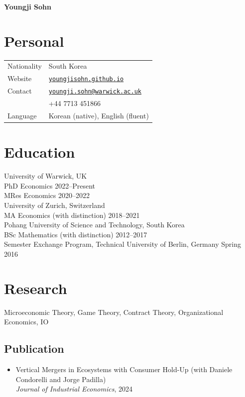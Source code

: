 \documentclass[11pt]{article}
\begin{document}
{\bfseries \large Youngji Sohn}\vspace{11pt}

\section*{Personal}
\begin{tabular}{@{}p{6.5em}l@{}}
{Nationality} 	& South Korea\\
{Website}  	&{\href{https://youngjisohn.github.io}{\texttt{youngjisohn.github.io}}}\\
{Contact}     	& \href{mailto:youngji.sohn@warwick.ac.uk}{\texttt{youngji.sohn@warwick.ac.uk}}\\
                     		& +44 7713 451866\\
{Language}    & Korean (native), English (fluent)\\
\end{tabular}
\section*{Education}
{University of Warwick}, UK\\
PhD Economics \hfill 2022--Present\\
MRes Economics \hfill 2020--2022\\[11pt]
{University of Zurich}, Switzerland\\
MA Economics (with distinction) \hfill 2018--2021\\[11pt]
{Pohang University of Science and Technology}, South Korea\\
BSc Mathematics (with distinction) \hfill 2012--2017\\
Semester Exchange Program, Technical University of Berlin, Germany \hfill Spring 2016

\section*{Research}
Microeconomic Theory, Game Theory, Contract Theory, Organizational Economics, IO



\subsection*{Publication}
\begin{itemize}[leftmargin=0em, nosep, itemsep=4pt]
\item 
{Vertical Mergers in Ecosystems with Consumer Hold-Up}
(with Daniele Condorelli and Jorge Padilla)\\
\textit{Journal of Industrial Economics}, 2024
\end{itemize} 
\end{document}
